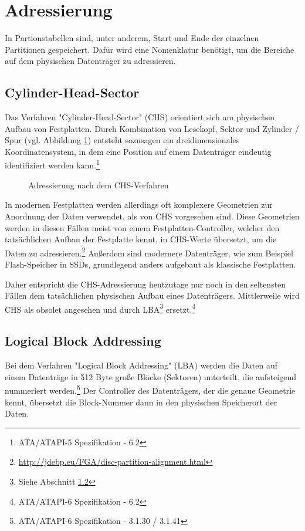 \section{Adressierung}
In Partionstabellen sind, unter anderem, Start und Ende der einzelnen Partitionen gespeichert.
Dafür wird eine Nomenklatur benötigt, um die Bereiche auf dem physischen Datenträger zu adressieren.

\subsection{Cylinder-Head-Sector}
Das Verfahren "Cylinder-Head-Sector" (CHS) orientiert sich am physischen Aufbau von Festplatten.
Durch Kombination von Lesekopf, Sektor und Zylinder / Spur (vgl. Abbildung \ref{fig:chs}) entsteht sozusagen ein dreidimensionales Koordinatensystem, in dem eine Position auf einem Datenträger eindeutig identifiziert werden kann.\footnote{ATA/ATAPI-5 Spezifikation - 6.2}

\begin{figure}[ht]
    \centering
    \fbox{}
    \caption{Adressierung nach dem CHS-Verfahren}
    \label{fig:chs}
\end{figure}

In modernen Festplatten werden allerdings oft komplexere Geometrien zur Anordnung der Daten verwendet, als von CHS vorgesehen sind.
Diese Geometrien werden in diesen Fällen meist von einem Festplatten-Controller, welcher den tatsächlichen Aufbau der Festplatte kennt, in CHS-Werte übersetzt, um die Daten zu adressieren.\footnote{\url{http://jdebp.eu/FGA/disc-partition-alignment.html}} 
Außerdem sind modernere Datenträger, wie zum Beispiel Flash-Speicher in SSDs, grundlegend anders aufgebaut als klassische Festplatten.

Daher entspricht die CHS-Adressierung heutzutage nur noch in den seltensten Fällen dem tatsächlichen physischen Aufbau eines Datenträgers. 
Mittlerweile wird CHS als obsolet angesehen und durch LBA\footnote{Siehe Abschnitt \ref{sec:LBA}} ersetzt.\footnote{ATA/ATAPI-6 Spezifikation - 6.2}


\subsection{Logical Block Addressing}
\label{sec:LBA}
Bei dem Verfahren "Logical Block Addressing" (LBA) werden die Daten auf einem Datenträge in 512 Byte große Blöcke (Sektoren) unterteilt, die aufsteigend nummeriert werden.\footnote{ATA/ATAPI-6 Spezifikation - 3.1.30 / 3.1.41}
Der Controller des Datenträgers, der die genaue Geometrie kennt, übersetzt die Block-Nummer dann in den physischen Speicherort der Daten.
